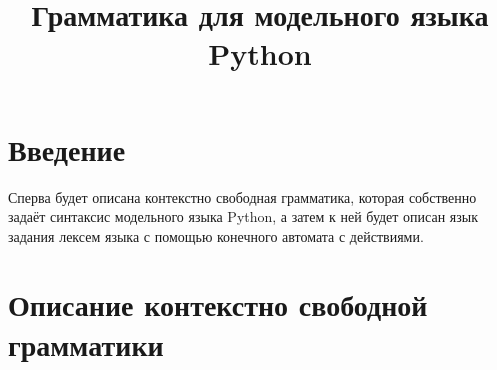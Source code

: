 \documentclass[russian,a4paper]{article}
\title{Грамматика для модельного языка Python}
\author{}
\date{}
\begin{document}
\maketitle

%
%
\section{Введение}

Сперва будет описана контекстно свободная грамматика, которая собственно задаёт синтаксис 
модельного языка Python, а затем к ней будет описан язык задания лексем языка с помощью конечного автомата с действиями.

\section{Описание контекстно свободной грамматики}
\end{document}
